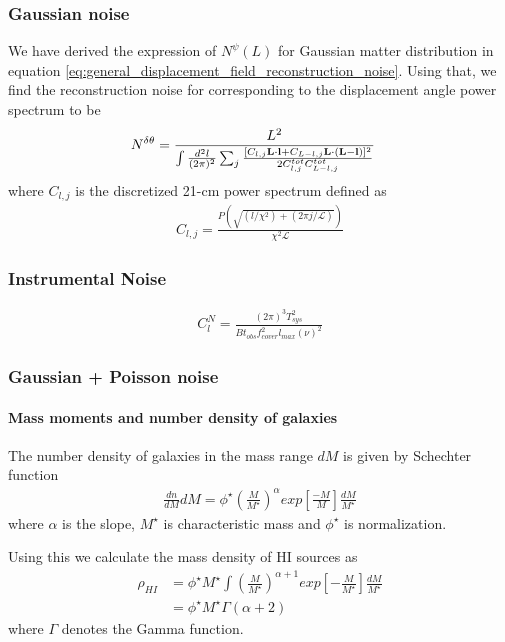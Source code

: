 \documentclass[12pt]{article}
\def\l{{\bf l}}
\def\L{{\bf L}}
\numberwithin{equation}{section}
\begin{document}
\subsubsection{Gaussian noise}
We have derived the expression of $ N^\psi(L) $ for Gaussian matter distribution in equation \eqref{eq:general_displacement_field_reconstruction_noise}. Using that, we find the reconstruction noise for corresponding to the displacement angle power spectrum to be
\begin{align}
N^{\delta\theta} &= \frac{L^2}{\int \frac{d^2 l}{(2\pi)^2} \sum_{j} \frac{[C_{l,j} \L\cdot \l +
		C_{L-l,j} \L\cdot (\L-\l)]^2}{2C^{tot}_{l,j}C^{tot}_{L-l,j}} }
	\label{eq:gauss_len_reco_noise}
\end{align}
where $ C_{l, j} $ is the discretized 21-cm power spectrum defined as 
\begin{align}
C_{l,j} = \frac{P(\sqrt{(l/\chi^2) + (2\pi j / \mathcal{L})})}{\chi^2\mathcal{L}}
\end{align}

\subsubsection{Instrumental Noise}
\begin{align}
C_l^N = \frac{(2\pi)^3 T_{sys}^2}{B t_{obs}f_{cover}^2 l_{max}(\nu)^2 }
\end{align}

\subsubsection{Gaussian + Poisson noise}

\paragraph{Mass moments and number density of galaxies}
The number density of galaxies in the mass range $ dM $ is given by Schechter function
\begin{align}
\frac{dn}{dM}dM = \phi^\star \left(\frac{M}{M^\star}\right)^\alpha exp \left[\frac{-M}{M}\right] \frac{dM}{M^\star}
\end{align}
where $\alpha$ is the slope, $ M^\star $ is characteristic mass and $\phi^\star$ is normalization.

Using this we calculate the mass density of HI sources as
\begin{align}
\rho_{HI}  &= \phi^{\star}M^\star \int \left(\frac{M}{M^\star}\right)^{\alpha + 1} exp\left[ -\frac{M}{M^\star} \right]\frac{dM}{M^\star}\\
&= \phi^\star M^\star \Gamma(\alpha + 2)
\end{align}
where $ \Gamma $ denotes the Gamma function.
\end{document}
